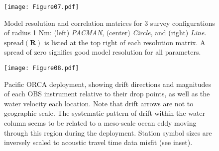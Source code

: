 \begin{figure}[h]
\texttt{[image: Figure07.pdf]}
\caption{ Model resolution and correlation matrices for 3 survey configurations of radius 1 Nm: (left) \textit{PACMAN}, (center) \textit{Circle}, and (right) \textit{Line}. $\text{spread}(\mathbf{R})$ is listed at the top right of each resolution matrix. A spread of zero signifies good model resolution for all parameters. }
\label{fig:resolution_correlation}
\end{figure}

\begin{figure}[h]
\texttt{[image: Figure08.pdf]}
\caption{Pacific ORCA deployment, showing drift directions and magnitudes of each OBS instrument relative to their drop points, as well as the water velocity each location. Note that drift arrows are not to geographic scale. The systematic pattern of drift within the water column seems to be related to a meso-scale ocean eddy moving through this region during the deployment. Station symbol sizes are inversely scaled to acoustic travel time data misfit (see inset).}
\label{fig:meso_eddy}
\end{figure}